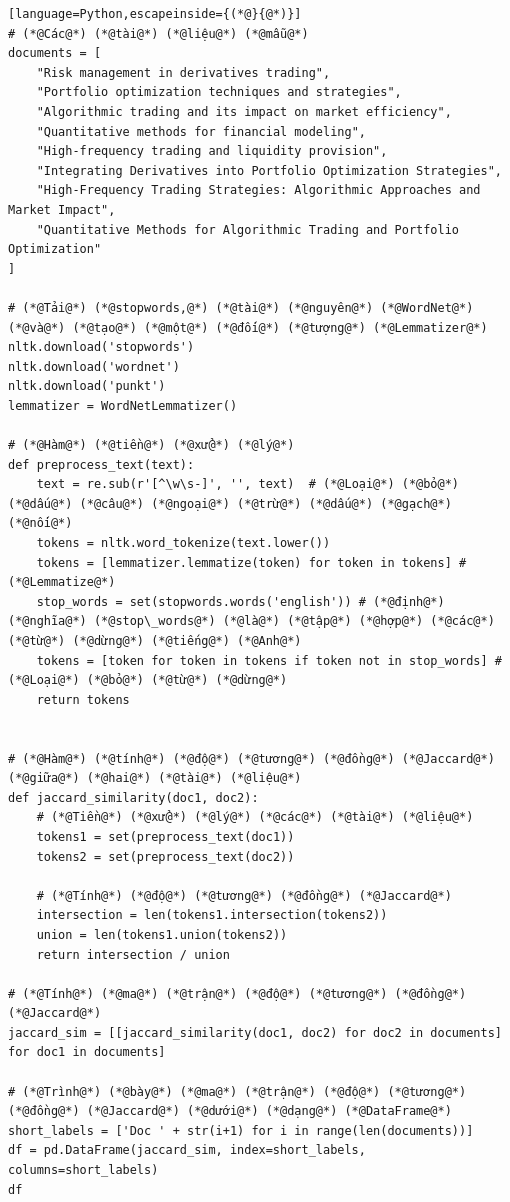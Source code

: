 \begin{lstlisting}[language=Python,escapeinside={(*@}{@*)}]
# (*@Các@*) (*@tài@*) (*@liệu@*) (*@mẫu@*)
documents = [
    "Risk management in derivatives trading",
    "Portfolio optimization techniques and strategies",
    "Algorithmic trading and its impact on market efficiency",
    "Quantitative methods for financial modeling",
    "High-frequency trading and liquidity provision",
    "Integrating Derivatives into Portfolio Optimization Strategies",
    "High-Frequency Trading Strategies: Algorithmic Approaches and Market Impact",
    "Quantitative Methods for Algorithmic Trading and Portfolio Optimization"
]

# (*@Tải@*) (*@stopwords,@*) (*@tài@*) (*@nguyên@*) (*@WordNet@*) (*@và@*) (*@tạo@*) (*@một@*) (*@đối@*) (*@tượng@*) (*@Lemmatizer@*)
nltk.download('stopwords')
nltk.download('wordnet')
nltk.download('punkt')
lemmatizer = WordNetLemmatizer()

# (*@Hàm@*) (*@tiền@*) (*@xử@*) (*@lý@*)
def preprocess_text(text):
    text = re.sub(r'[^\w\s-]', '', text)  # (*@Loại@*) (*@bỏ@*) (*@dấu@*) (*@câu@*) (*@ngoại@*) (*@trừ@*) (*@dấu@*) (*@gạch@*) (*@nối@*)
    tokens = nltk.word_tokenize(text.lower())
    tokens = [lemmatizer.lemmatize(token) for token in tokens] # (*@Lemmatize@*)
    stop_words = set(stopwords.words('english')) # (*@định@*) (*@nghĩa@*) (*@stop\_words@*) (*@là@*) (*@tập@*) (*@hợp@*) (*@các@*) (*@từ@*) (*@dừng@*) (*@tiếng@*) (*@Anh@*)
    tokens = [token for token in tokens if token not in stop_words] # (*@Loại@*) (*@bỏ@*) (*@từ@*) (*@dừng@*)
    return tokens


# (*@Hàm@*) (*@tính@*) (*@độ@*) (*@tương@*) (*@đồng@*) (*@Jaccard@*) (*@giữa@*) (*@hai@*) (*@tài@*) (*@liệu@*)
def jaccard_similarity(doc1, doc2):
    # (*@Tiền@*) (*@xử@*) (*@lý@*) (*@các@*) (*@tài@*) (*@liệu@*)
    tokens1 = set(preprocess_text(doc1))
    tokens2 = set(preprocess_text(doc2))

    # (*@Tính@*) (*@độ@*) (*@tương@*) (*@đồng@*) (*@Jaccard@*)
    intersection = len(tokens1.intersection(tokens2))
    union = len(tokens1.union(tokens2))
    return intersection / union

# (*@Tính@*) (*@ma@*) (*@trận@*) (*@độ@*) (*@tương@*) (*@đồng@*) (*@Jaccard@*)
jaccard_sim = [[jaccard_similarity(doc1, doc2) for doc2 in documents] for doc1 in documents]

# (*@Trình@*) (*@bày@*) (*@ma@*) (*@trận@*) (*@độ@*) (*@tương@*) (*@đồng@*) (*@Jaccard@*) (*@dưới@*) (*@dạng@*) (*@DataFrame@*)
short_labels = ['Doc ' + str(i+1) for i in range(len(documents))]
df = pd.DataFrame(jaccard_sim, index=short_labels, columns=short_labels)
df
\end{lstlisting}

